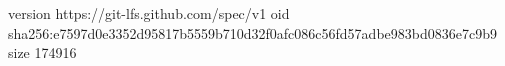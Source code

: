 version https://git-lfs.github.com/spec/v1
oid sha256:e7597d0e3352d95817b5559b710d32f0afc086c56fd57adbe983bd0836e7c9b9
size 174916
